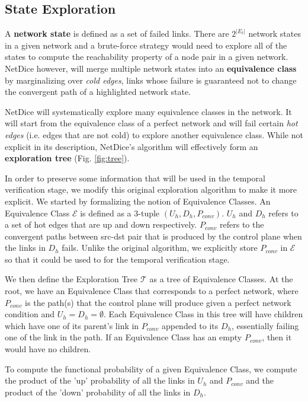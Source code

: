 \documentclass[10pt,sigconf,letterpaper,anonymous,nonacm]{acmart}
\begin{document}
\subsection{State Exploration}
A \textbf{network state} is defined as a set of failed links.
There are $2^{|E_t|}$ network states in a given network and a brute-force strategy 
would need to explore all of the states to compute the reachability property of a 
node pair in a given network. 
NetDice however, will merge multiple network states into an \textbf{equivalence class}
by marginalizing over \textit{cold edges}, links whose failure is guaranteed not to 
change the convergent path of a highlighted network state.

NetDice will systematically explore many equivalence classes in the network. 
It will start from the equivalence class of a perfect network and will fail certain 
\textit{hot edges} (i.e. edges that are not cold) to explore another equivalence 
class.
While not explicit in its description, NetDice's algorithm will effectively form an 
\textbf{exploration tree} (Fig. \ref{fig:tree}). 

In order to preserve some information that will be used in the temporal verification 
stage, we modify this original exploration algorithm to make it more explicit.
We started by formalizing the notion of Equivalence Classes.
An Equivalence Class $\mathcal{E}$ is defined as a 3-tuple $(U_h, D_h, P_{conv})$.
$U_h$ and $D_h$ refers to a set of hot edges that are up and down respectively.
$P_{conv}$ refers to the convergent paths between src-dst pair that is produced by the
control plane when the links in $D_h$ fails.
Unlike the original algorithm, we explicitly store $P_{conv}$ in $\mathcal{E}$ so that 
it could be used to for the temporal verification stage.

We then define the Exploration Tree $\mathcal{T}$ as a tree of Equivalence Classes.
At the root, we have an Equivalence Class that corresponds to a perfect network, where 
$P_{conv}$ is the path(s) that the control plane will produce given a perfect network 
condition and $U_h = D_h = \emptyset$.
Each Equivalence Class in this tree will have children which have one of its parent's link in 
$P_{conv}$ appended to its $D_h$, essentially failing one of the link in the path.
If an Equivalence Class has an empty $P_{conv}$, then it would have no children.

To compute the functional probability of a given Equivalence Class, we compute the 
product of the 'up' probability of all the links in $U_h$ and $P_{conv}$ and the 
product of the 'down' probability of all the links in $D_h$.
\end{document}

